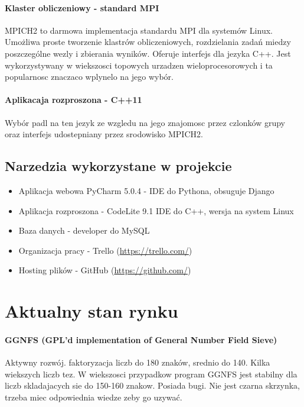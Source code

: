\documentclass{article}
\begin{document}
\paragraph{Klaster obliczeniowy - standard MPI\cite{mpich2}} MPICH2 to darmowa implementacja standardu MPI dla systemów Linux. Umożliwa proste tworzenie klastrów obliczeniowych, rozdzielania zadań miedzy poszczególne wezly i zbierania wyników. Oferuje interfejs dla jezyka C++. Jest wykorzystywany w wiekszosci topowych urzadzen wieloprocesorowych i ta popularnosc znaczaco wplynelo na jego wybór.

\paragraph{Aplikacaja rozproszona - C++11}
Wybór padl na ten jezyk ze wzgledu na jego znajomosc przez czlonków grupy oraz interfejs udostepniany przez srodowisko MPICH2.

\subsection{Narzedzia wykorzystane w projekcie}
\begin{itemize}
\item Aplikacja webowa PyCharm 5.0.4 - IDE do Pythona, obsuguje Django
\item Aplikacja rozproszona - CodeLite 9.1 IDE do C++, wersja na system Linux
\item Baza danych - developer do MySQL
\item Organizacja pracy - Trello (\url{https://trello.com/})
\item Hosting plików - GitHub (\url{https://github.com/}) 
\end{itemize}

\section{Aktualny stan rynku}

\paragraph{GGNFS (GPL'd implementation of General Number Field Sieve)} Aktywny rozwój. faktoryzacja liczb do 180 znaków, srednio do 140. Kilka wiekszych liczb tez. W wiekszosci przypadkow program GGNFS jest stabilny dla liczb skladajacych sie do 150-160 znakow. Posiada bugi. Nie jest czarna skrzynka, trzeba miec odpowiednia wiedze zeby go uzywać.
\end{document}
